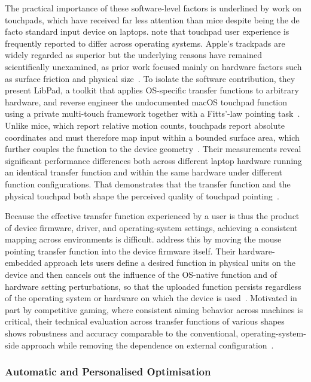 \documentclass[12pt,a4paper]{report}
\begin{document}
        The practical importance of these software-level factors is underlined by work on touchpads, which have received far less attention than mice despite being the de facto standard input device on laptops. \citeauthor{an2025libpad} note that touchpad user experience is frequently reported to differ across operating systems. Apple's trackpads are widely regarded as superior but the underlying reasons have remained scientifically unexamined, as prior work focused mainly on hardware factors such as surface friction and physical size~\cite{an2025libpad}. To isolate the software contribution, they present LibPad, a toolkit that applies OS-specific transfer functions to arbitrary hardware, and reverse engineer the undocumented macOS touchpad function using a private multi-touch framework together with a Fitts'-law pointing task~\cite{an2025libpad}. Unlike mice, which report relative motion counts, touchpads report absolute coordinates and must therefore map input within a bounded surface area, which further couples the function to the device geometry~\cite{an2025libpad}. Their measurements reveal significant performance differences both across different laptop hardware running an identical transfer function and within the same hardware under different function configurations. That demonstrates that the transfer function and the physical touchpad both shape the perceived quality of touchpad pointing~\cite{an2025libpad}.

        Because the effective transfer function experienced by a user is thus the product of device firmware, driver, and operating-system settings, achieving a consistent mapping across environments is difficult. \citeauthor{kim2025hardware} address this by moving the mouse pointing transfer function into the device firmware itself. Their hardware-embedded approach lets users define a desired function in physical units on the device and then cancels out the influence of the OS-native function and of hardware setting perturbations, so that the uploaded function persists regardless of the operating system or hardware on which the device is used~\cite{kim2025hardware}. Motivated in part by competitive gaming, where consistent aiming behavior across machines is critical, their technical evaluation across transfer functions of various shapes shows robustness and accuracy comparable to the conventional, operating-system-side approach while removing the dependence on external configuration~\cite{kim2025hardware}.

        \subsubsection{Automatic and Personalised Optimisation}
\end{document}
